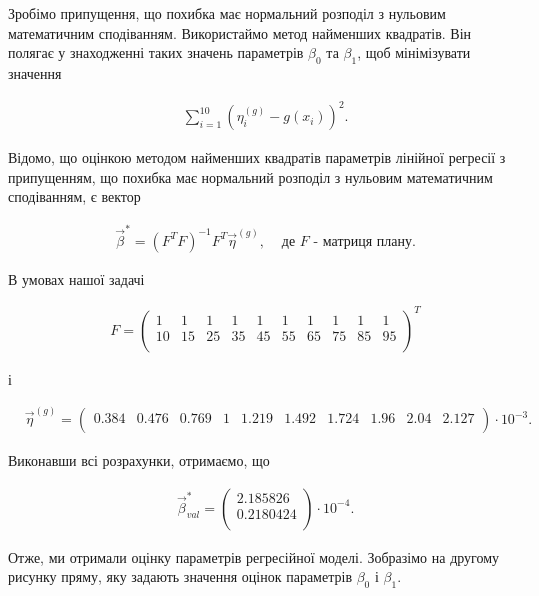 \documentclass[14pt,a4paper]{scrartcl}
\theoremstyle{definition}
\theoremstyle{remark}
\theoremstyle{definition}
\theoremstyle{definition}
\begin{document}
Зробімо припущення, що похибка має нормальний розподіл з нульовим математичним сподіванням. Використаймо метод найменших квадратів. Він полягає у знаходженні таких значень параметрів $\beta_{0}$ та $\beta_{1}$, щоб мінімізувати значення

\begin{align*}
  & \sum_{i = 1}^{10} (\eta^{(g)}_{i} - g(x_{i}))^2.
\end{align*}

Відомо, що оцінкою методом найменших квадратів параметрів лінійної регресії з припущенням, що похибка має нормальний розподіл з нульовим математичним сподіванням, є вектор

\begin{align*}
  & \vec{\beta}^{*} = (F^{T}F)^{-1}F^{T}\vec{\eta}^{(g)}, &\text{  де  } F \text{ - матриця плану.}
\end{align*}

В умовах нашої задачі

\begin{align*}
  & F = \begin{pmatrix}
    1 & 1 & 1 & 1 & 1 & 1 & 1 & 1 & 1 & 1 \\
    10 & 15 & 25 & 35 & 45 & 55 & 65 & 75 & 85 & 95  \\
  \end{pmatrix}^{T}
\end{align*}

і

\begin{align*}
  & \vec{\eta}^{(g)} =\begin{pmatrix}
    0.384 & 0.476 & 0.769 & 1 & 1.219 & 1.492 & 1.724 & 1.96 & 2.04 & 2.127 \\
  \end{pmatrix} \cdot 10^{-3}.
\end{align*}

Виконавши всі розрахунки, отримаємо, що

\begin{align*}
  & \vec{\beta}^{*}_ {val} = \begin{pmatrix}
    2.185826  \\
    0.2180424  \\
  \end{pmatrix} \cdot 10^{-4}.
\end{align*}

Отже, ми отримали оцінку параметрів регресійної моделі. Зобразімо на другому рисунку пряму, яку задають значення оцінок параметрів $\beta_{0}$ і $\beta_{1}$.
\end{document}

